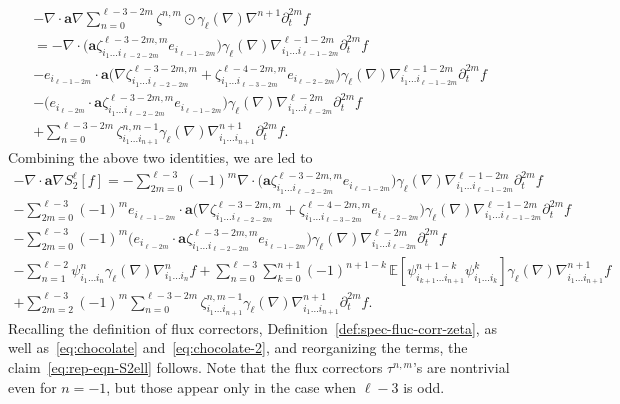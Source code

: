 \documentclass[JEP,XML,SOM,Unicode,published]{cedram}
\theoremstyle{plain}
\theoremstyle{definition}
\numberwithin{equation}{section}
\newcommand{\ee}{e}
\newcommand{\Aa}{\boldsymbol a}
\newcommand{\expec}[1]{\mathbb{E}\left[ #1 \right]}
\begin{document}
\begin{multline*}
-\nabla\cdot\Aa\nabla\sum_{n=0}^{\ell-3-2m}\zeta^{n,m} \odot \gamma_{\ell}(\nabla)\nabla^{n+1}\partial_t^{2m} f\\
=
-\nabla\cdot\big(\Aa\zeta^{\ell-3-2m,m}_{i_1\ldots i_{\ell-2-2m}}\ee_{i_{\ell-1-2m}}\big)\gamma_{\ell}(\nabla)\nabla^{\ell-1-2m}_{i_1\ldots i_{\ell-1-2m}}\partial_t^{2m} f\\
-\ee_{i_{\ell-1-2m}}\cdot\Aa\big(\nabla\zeta^{\ell-3-2m,m}_{i_1\ldots i_{\ell-2-2m}}+\zeta^{\ell-4-2m,m}_{i_1\ldots i_{\ell-3-2m}}\ee_{i_{\ell-2-2m}}\big)\gamma_{\ell}(\nabla)\nabla^{\ell-1-2m}_{i_1\ldots i_{\ell-1-2m}}\partial_t^{2m} f\\
-\big(\ee_{i_{\ell-2m}}\cdot\Aa\zeta^{\ell-3-2m,m}_{i_1\ldots i_{\ell-2-2m}}\ee_{i_{\ell-1-2m}}\big)\gamma_{\ell}(\nabla)\nabla^{\ell-2m}_{i_1\ldots i_{\ell-2m}}\partial_t^{2m} f\\
+\sum_{n=0}^{\ell-3-2m}\zeta^{n,m-1}_{i_1\ldots i_{n+1}}\gamma_{\ell}(\nabla)\nabla^{n+1}_{i_1\ldots i_{n+1}}\partial_t^{2m} f.
\end{multline*}
Combining the above two identities, we are led to\vspace*{-3pt}
\begin{multline*}
-\nabla\cdot\Aa\nabla S_2^\ell[f]
=-\sum_{2m=0}^{\ell-3}(-1)^m\nabla\cdot\big(\Aa\zeta^{\ell-3-2m,m}_{i_1\ldots i_{\ell-2-2m}}\ee_{i_{\ell-1-2m}}\big)\gamma_{\ell}(\nabla)\nabla^{\ell-1-2m}_{i_1\ldots i_{\ell-1-2m}}\partial_t^{2m} f\\
-\sum_{2m=0}^{\ell-3}(-1)^m\ee_{i_{\ell-1-2m}}\cdot\Aa\big(\nabla\zeta^{\ell-3-2m,m}_{i_1\ldots i_{\ell-2-2m}}+\zeta^{\ell-4-2m,m}_{i_1\ldots i_{\ell-3-2m}}\ee_{i_{\ell-2-2m}}\big)\gamma_{\ell}(\nabla)\nabla^{\ell-1-2m}_{i_1\ldots i_{\ell-1-2m}}\partial_t^{2m} f\\
-\sum_{2m=0}^{\ell-3}(-1)^m\big(\ee_{i_{\ell-2m}}\cdot\Aa\zeta^{\ell-3-2m,m}_{i_1\ldots i_{\ell-2-2m}}\ee_{i_{\ell-1-2m}}\big)\gamma_{\ell}(\nabla)\nabla^{\ell-2m}_{i_1\ldots i_{\ell-2m}}\partial_t^{2m} f\\
-\sum_{n=1}^{\ell-2}\psi^{n}_{i_1\ldots i_{n}}\gamma_{\ell}(\nabla)\nabla^{n}_{i_1\ldots i_{n}} f
+\sum_{n=0}^{\ell-3}\sum_{k=0}^{n+1}(-1)^{n+1-k}\,\expec{\psi^{n+1-k}_{i_{k+1}\ldots i_{n+1}}\psi^k_{i_{1}\ldots i_k}}\gamma_{\ell}(\nabla)\nabla^{n+1}_{i_1\ldots i_{n+1}} f\\
+\sum_{2m=2}^{\ell-3}(-1)^m\sum_{n=0}^{\ell-3-2m}\zeta^{n,m-1}_{i_1\ldots i_{n+1}}\gamma_{\ell}(\nabla)\nabla^{n+1}_{i_1\ldots i_{n+1}}\partial_t^{2m} f.
\end{multline*}
Recalling the definition of flux correctors, \cf Definition~\ref{def:spec-fluc-corr-zeta}, as well as~\eqref{eq:chocolate} and~\eqref{eq:chocolate-2}, and reorganizing the terms, the claim~\eqref{eq:rep-eqn-S2ell} follows. Note that the flux correctors $\tau^{n,m}$'s are nontrivial even for $n=-1$, but those appear only in the case when $\ell-3$ is odd.
\end{document}
